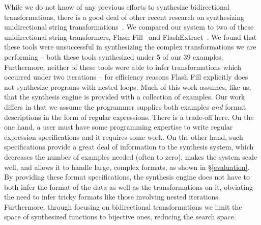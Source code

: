 \documentclass[sigplan,acmsmall]{acmart}
\begin{document}
While we do not know of any previous efforts to synthesize bidirectional
transformations, there is a good deal of other recent research on
synthesizing unidirectional string
transformations~\cite{singh2012learning,le-pldi-2014,gulwani-popl-2014,perelman2014test,Singh:blinkfill}.
We compared our system to two of these unidirectional string transformers,
Flash Fill~\cite{gulwani-popl-2014} and FlashExtract~\cite{le-pldi-2014}.
We found that these tools were unsuccessful in synthesizing the complex
transformations we are performing -- both these tools synthesized under 5 of our
39 examples.  Furthermore, neither of these tools were able to infer
transformations 
which occurred under two iterations -- for efficiency reasons Flash Fill
explicitly does not synthesize programs with nested loops.
Much of this work assumes, like us, that the synthesis engine is provided with a
collection of 
examples.  Our work differs in that we assume the programmer supplies
both examples {\em and} format descriptions in the form of regular expressions.
There is a trade-off here.  On the one hand, a user must have some 
programming expertise to
write regular expression specifications
and it requires some work.
On the other hand, such specifications provide a great deal of information
to the synthesis system, which decreases the number of examples needed
(often to zero), makes the system scale well, and
allows it to handle large, complex formats, as shown
in \S \ref{evaluation}.  By providing these format specifications, the synthesis
engine does not have to both infer the format of the data as well as the
transformations on it, obviating the need to infer tricky formats like those
involving nested iterations.
Furthermore, through focusing on bidirectional transformations we limit the
space of synthesized functions to bijective ones, reducing the search space.
\end{document}
